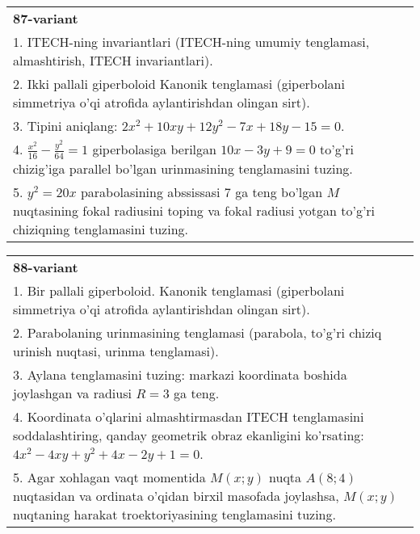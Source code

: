 \documentclass{article}
\begin{document}
\begin{tabular}{m{17cm}}
\textbf{87-variant}\\
1. ITECH-ning invariantlari (ITECH-ning umumiy tenglamasi, almashtirish, ITECH invariantlari).\\

2. Ikki pallali giperboloid Kanonik tenglamasi (giperbolani simmetriya o'qi atrofida aylantirishdan olingan sirt).\\

3. Tipini aniqlang: $2x^{2}+10xy+12y^{2}-7x+18y-15=0$.\\

4. $\frac{x^{2}}{16} - \frac{y^{2}}{64} = 1$ giperbolasiga berilgan $10x - 3y + 9 = 0$ to'g'ri chizig'iga parallel bo'lgan urinmasining tenglamasini tuzing.  \\

5. $y^{2} = 20x$ parabolasining abssissasi 7 ga teng bo'lgan $M$ nuqtasining fokal radiusini toping va fokal radiusi yotgan to'g'ri chiziqning tenglamasini tuzing.  
\end{tabular}
\vspace{1cm}


\begin{tabular}{m{17cm}}
\textbf{88-variant}\\
1. Bir pallali giperboloid. Kanonik tenglamasi (giperbolani simmetriya o'qi atrofida aylantirishdan olingan sirt).\\

2. Parabolaning urinmasining tenglamasi (parabola, to'g'ri chiziq urinish nuqtasi, urinma tenglamasi).\\

3. Aylana tenglamasini tuzing: markazi koordinata boshida joylashgan va radiusi $R=3$ ga teng.\\

4. Koordinata o'qlarini almashtirmasdan ITECH tenglamasini soddalashtiring, qanday geometrik obraz ekanligini ko'rsating: $4x^{2} - 4xy + y^{2} + 4x - 2y + 1 = 0$.  \\

5. Agar xohlagan vaqt momentida $M(x;y)$ nuqta $A(8;4)$ nuqtasidan va ordinata o'qidan birxil masofada joylashsa, $M(x;y)$ nuqtaning harakat troektoriyasining tenglamasini tuzing.  
\end{tabular}
\vspace{1cm}
\end{document}
